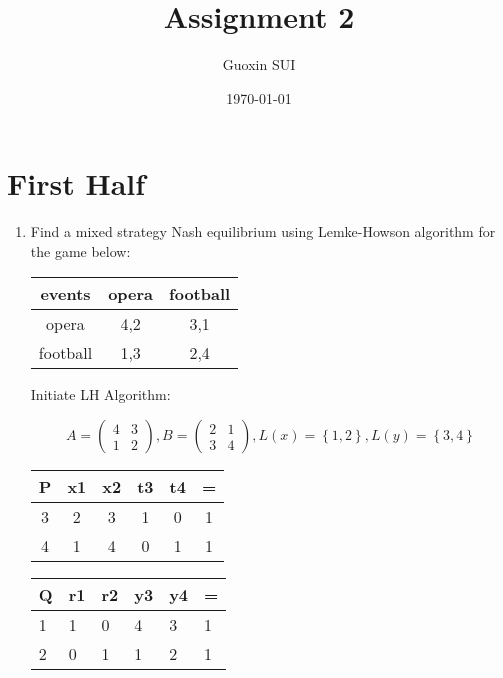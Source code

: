 \documentclass{article}
\title{Assignment 2}
\author{Guoxin SUI}
\date{\today}
\newenvironment{answer}{\par\color{ForestGreen}}{\par}
\begin{document}
\maketitle

\section{First Half}

\begin{enumerate}
    \item
    Find a mixed strategy Nash equilibrium using Lemke-Howson algorithm for the game below:
    \begin{table}[h!]
      \centering
      \begin{tabular}[t]{ccc}
        \toprule
        events & opera & football \\
        \midrule
        opera & 4,2 & 3,1 \\
        \hline
        football & 1,3 & 2,4 \\
        \bottomrule
     \end{tabular}
   \end{table}
\begin{answer}
    Initiate LH Algorithm:

    $$A = \begin{pmatrix}
          4 & 3 \\
          1 & 2
        \end{pmatrix},
    B = \begin{pmatrix}
          2 & 1 \\
          3 & 4
        \end{pmatrix}, L(x)=\left\{1,2\right\}, L(y)=\left\{3,4\right\}$$
\begin{table}[!htb]
  \begin{answer}
\begin{minipage}[t]{.5\textwidth}
\centering
    \begin{tabular}[t]{cccccc}
      \toprule
      P & x1 & x2 & t3 & t4 & = \\
      \midrule
      3 & 2 & 3 & 1 & 0 & 1 \\
      \hline
      4 & 1 & 4 & 0 & 1 & 1 \\
      \bottomrule
    \end{tabular}
\end{minipage}
\begin{minipage}[t]{0.5\textwidth}
\centering
    \begin{tabular}[t]{llllll}
      \toprule
      Q & r1 & r2 & y3 & y4 & = \\
      \midrule
      1 & 1 & 0 & 4 & 3 & 1 \\
      \hline
      2 & 0 & 1 & 1 & 2 & 1 \\
      \bottomrule
    \end{tabular}
\end{minipage}
\end{answer}
\end{table}


\end{answer}
\end{enumerate}
\end{document}
